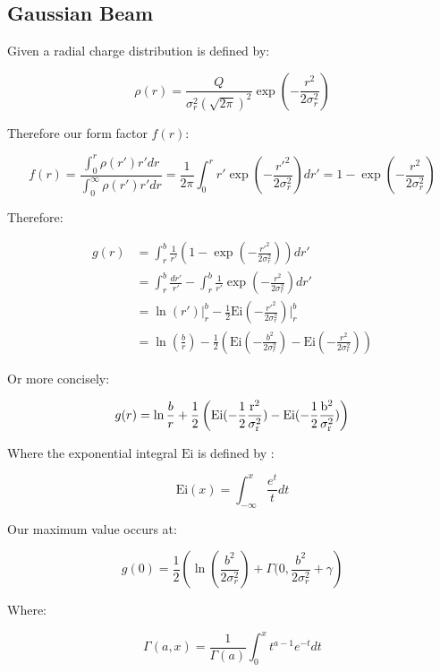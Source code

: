 \subsection{Gaussian Beam}

Given a radial charge distribution is defined by:

$$\rho(r) = \frac{Q}{\sigma_r^2(\sqrt{2\pi})^2}\exp\left(-\frac{r^2}{2\sigma_r^2}\right)$$

Therefore our form factor $f(r)$:

$$f(r) = \frac{\int_0^r\rho(r')r'dr}{\int_0^\infty \rho(r')r'dr} = \frac{1}{2\pi}\int_0^r r'\exp\left(-\frac{r'^2}{2\sigma_r^2}\right)dr' = 1-\exp\left(-\frac{r^2}{2\sigma_r^2}\right)$$

Therefore:

$$\begin{aligned}
        g(r) & = \int_r^b\frac{1}{r'}\left(1-\exp\left(-\frac{r'^2}{2\sigma_r^2}\right)\right)dr'                                            \\
             & =\int_r^b\frac{dr'}{r'} -\int_r^b\frac{1}{r'}\exp\left(-\frac{r^2}{2\sigma_r^2}\right)dr'                                     \\
             & = \ln(r')\Big|_r^b -\frac{1}{2}\text{Ei}\left(-\frac{r'^2}{2\sigma_r^2}\right)\Big|_r^b                                       \\
             & = \ln\left(\frac{b}{r}\right)-\frac{1}{2}\left(\text{Ei}(-\frac{b^2}{2\sigma_r^2})-\text{Ei}(-\frac{r^2}{2\sigma_r^2})\right)
    \end{aligned}$$

Or more concisely:

\begin{equation}
    g(r) = \ln\frac{b}{r} + \frac{1}{2}\left(\rm{Ei}(-\frac{1}{2}\frac{r^2}{\sigma_r^2})-\rm{Ei}(-\frac{1}{2}\frac{b^2}{\sigma_r^2})\right)
    \label{eq:g_gaussian}
\end{equation}

Where the exponential integral $\text{Ei}$ is defined by \cite{abramowitz_handbook_2013}: %

$$\text{Ei}(x) = \int_{-\infty}^x \frac{e^t}{t}dt$$

Our maximum value occurs at:

$$g(0) = \frac{1}{2}\left(\ln\left(\frac{b^2}{2\sigma_r^2}\right)+\Gamma(0, \frac{b^2}{2\sigma_r^2}+\gamma\right)$$

Where:

$$\Gamma(a, x) = \frac{1}{\Gamma(a)}\int_0^xt^{a-1}e^{-t}dt$$

